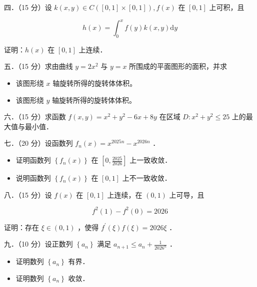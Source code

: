 \documentclass{article}
\begin{document}
四．（15 分）设 \(k(x, y) \in C([0,1] \times[0,1]), f(x)\) 在 \([0,1]\) 上可积，且

\[
h(x)=\int_{0}^{x} f(y) k(x, y) \mathrm{d} y
\]

证明：\(h(x)\) 在 \([0,1]\) 上连续．

五．（15 分）求由曲线 \(y=2 x^{2}\) 与 \(y=x\) 所围成的平面图形的面积，并求

\begin{itemize}
  \item[（1）] 该图形绕 \(x\) 轴旋转所得的旋转体体积。
  \item[（2）] 该图形绕 \(y\) 轴旋转所得的旋转体体积。
\end{itemize}

六．（15 分）求函数 \(f(x, y)=x^{2}+y^{2}-6 x+8 y\) 在区域 \(D: x^{2}+y^{2} \leq 25\) 上的最大值与最小值．

七．（20 分）设函数列 \(f_{n}(x)=x^{2025 n}-x^{2026 n}\) ．

\begin{itemize}
  \item[（1）] 证明函数列 \(\left\{f_{n}(x)\right\}\) 在 \(\left[0, \frac{2025}{2026}\right]\) 上一致收敛．
  \item[（2）] 说明函数列 \(\left\{f_{n}(x)\right\}\) 在 \([0,1]\) 上不一致收敛．
\end{itemize}

八．（15 分）设 \(f(x)\) 在 \([0,1]\) 上连续，在 \((0,1)\) 上可导，且

\[
f^{2}(1)-f^{2}(0)=2026
\]

证明：存在 \(\xi \in(0,1)\) ，使得 \(f^{\prime}(\xi) f(\xi)=2026 \xi\) ．

九．（10 分）设正数列 \(\left\{a_{n}\right\}\) 满足 \(a_{n+1} \leq a_{n}+\frac{1}{2026^{n}}\) ．

\begin{itemize}
  \item[（1）] 证明数列 \(\left\{a_{n}\right\}\) 有界．
  \item[（2）] 证明数列 \(\left\{a_{n}\right\}\) 收敛．
\end{itemize}
\end{document}
